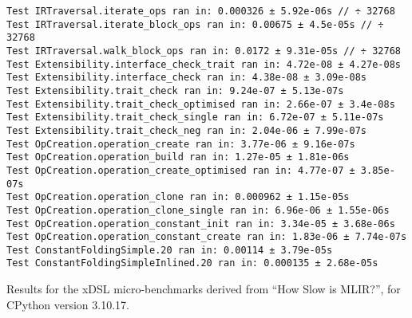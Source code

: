 \begin{code}
    \begin{verbatim}
Test IRTraversal.iterate_ops ran in: 0.000326 ± 5.92e-06s // ÷ 32768
Test IRTraversal.iterate_block_ops ran in: 0.00675 ± 4.5e-05s // ÷ 32768
Test IRTraversal.walk_block_ops ran in: 0.0172 ± 9.31e-05s // ÷ 32768
Test Extensibility.interface_check_trait ran in: 4.72e-08 ± 4.27e-08s
Test Extensibility.interface_check ran in: 4.38e-08 ± 3.09e-08s
Test Extensibility.trait_check ran in: 9.24e-07 ± 5.13e-07s
Test Extensibility.trait_check_optimised ran in: 2.66e-07 ± 3.4e-08s
Test Extensibility.trait_check_single ran in: 6.72e-07 ± 5.11e-07s
Test Extensibility.trait_check_neg ran in: 2.04e-06 ± 7.99e-07s
Test OpCreation.operation_create ran in: 3.77e-06 ± 9.16e-07s
Test OpCreation.operation_build ran in: 1.27e-05 ± 1.81e-06s
Test OpCreation.operation_create_optimised ran in: 4.77e-07 ± 3.85e-07s
Test OpCreation.operation_clone ran in: 0.000962 ± 1.15e-05s
Test OpCreation.operation_clone_single ran in: 6.96e-06 ± 1.55e-06s
Test OpCreation.operation_constant_init ran in: 3.34e-05 ± 3.68e-06s
Test OpCreation.operation_constant_create ran in: 1.83e-06 ± 7.74e-07s
Test ConstantFoldingSimple.20 ran in: 0.00114 ± 3.79e-05s
Test ConstantFoldingSimpleInlined.20 ran in: 0.000135 ± 2.68e-05s
    \end{verbatim}
    \caption{Results for the xDSL micro-benchmarks derived from ``How Slow is MLIR?'', for CPython version 3.10.17.}
    \label{listing:how-slow-is-mlir-xdsl-microbenchmark-results-310}
\end{code}
